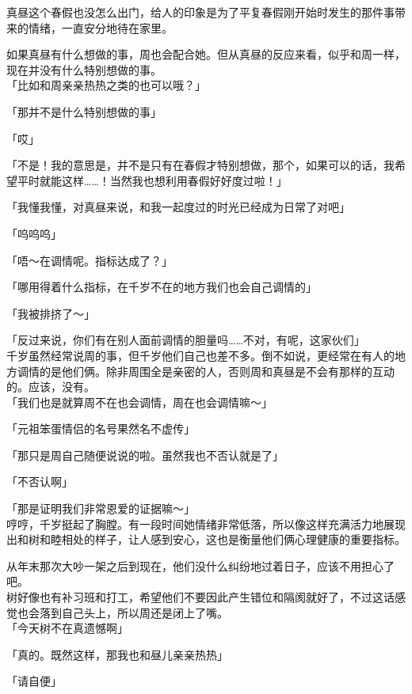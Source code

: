 真昼这个春假也没怎么出门，给人的印象是为了平复春假刚开始时发生的那件事带来的情绪，一直安分地待在家里。

如果真昼有什么想做的事，周也会配合她。但从真昼的反应来看，似乎和周一样，现在并没有什么特别想做的事。\\

「比如和周亲亲热热之类的也可以哦？」

「那并不是什么特别想做的事」

「哎」

「不是！我的意思是，并不是只有在春假才特别想做，那个，如果可以的话，我希望平时就能这样……！当然我也想利用春假好好度过啦！」

「我懂我懂，对真昼来说，和我一起度过的时光已经成为日常了对吧」

「呜呜呜」

「唔～在调情呢。指标达成了？」

「哪用得着什么指标，在千岁不在的地方我们也会自己调情的」

「我被排挤了～」

「反过来说，你们有在别人面前调情的胆量吗……不对，有呢，这家伙们」\\

千岁虽然经常说周的事，但千岁他们自己也差不多。倒不如说，更经常在有人的地方调情的是他们俩。除非周围全是亲密的人，否则周和真昼是不会有那样的互动的。应该，没有。\\

「我们也是就算周不在也会调情，周在也会调情嘛～」

「元祖笨蛋情侣的名号果然名不虚传」

「那只是周自己随便说说的啦。虽然我也不否认就是了」

「不否认啊」

「那是证明我们非常恩爱的证据嘛～」\\

哼哼，千岁挺起了胸膛。有一段时间她情绪非常低落，所以像这样充满活力地展现出和树和睦相处的样子，让人感到安心，这也是衡量他们俩心理健康的重要指标。

从年末那次大吵一架之后到现在，他们没什么纠纷地过着日子，应该不用担心了吧。\\

树好像也有补习班和打工，希望他们不要因此产生错位和隔阂就好了，不过这话感觉也会落到自己头上，所以周还是闭上了嘴。\\

「今天树不在真遗憾啊」

「真的。既然这样，那我也和昼儿亲亲热热」

「请自便」

